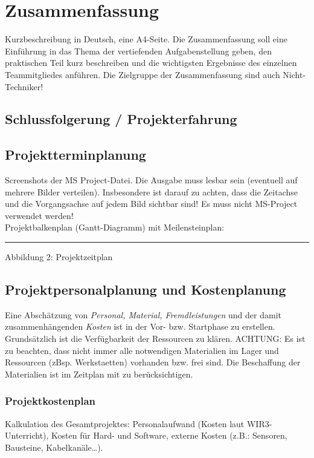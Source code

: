 \documentclass[12pt,a4paper]{article}
\newcommand{\yhbu}[0]{\color{ydkbu}}	%
\begin{document}
{\section{\sc Zusammenfassung}
	{\yhbu
	Kurzbeschreibung in Deutsch, eine A4-Seite.
	Die Zusammenfassung soll eine Einführung in das Thema
	der vertiefenden Aufgabenstellung geben,
	den praktischen Teil kurz beschreiben und die wichtigsten Ergebnisse
	des einzelnen Teammitgliedes anführen.
	Die Zielgruppe der Zusammenfassung sind auch Nicht-Techniker!
	}

 \subsection{Schlussfolgerung / Projekterfahrung}

 \subsection{Projektterminplanung}
	{\yhbu
	Screenshots der MS Project-Datei.
	Die Ausgabe muss lesbar sein (eventuell auf mehrere Bilder verteilen).
	Insbesondere ist darauf zu achten,
	dass die Zeitachse und die Vorgangsachse auf jedem Bild sichtbar sind!
	Es muss nicht MS-Project verwendet werden!
	\\[2mm]
	Projektbalkenplan (Gantt-Diagramm) mit Meilensteinplan:
	}
	\\[2mm]
	\hspace*{12mm}
	\rule{37mm}{0pt} Abbildung 2: Projektzeitplan

 \subsection{Projektpersonalplanung und Kostenplanung}
	{\yhbu
	Eine Abschätzung von
	{\em Personal, Material, Fremdleistungen}
	und der damit zusammenhängenden {\em Kosten}
	ist in der Vor- bzw. Startphase zu erstellen.
	\\[1mm]
	Grundsätzlich ist die Verfügbarkeit der Ressourcen zu klären.
	ACHTUNG: Es ist zu beachten,
	dass nicht immer alle notwendigen Materialien im Lager
	und Ressourcen (zBsp. Werkstaetten)
	vorhanden bzw. frei sind.
	Die Beschaffung der Materialien ist im Zeitplan mit zu berücksichtigen.
	}

  \subsubsection{Projektkostenplan}
	{\yhbu
	Kalkulation des Gesamtprojektes:
	Personalaufwand (Kosten laut WIR3-Unterricht),
	Kosten für Hard- und Software,
	externe Kosten (z.B.: Sensoren, Bausteine, Kabelkanäle\ldots).
	}

}
\end{document}
